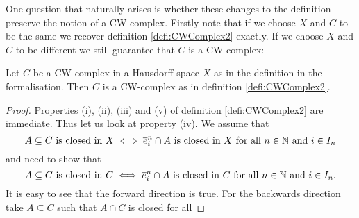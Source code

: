One question that naturally arises is whether these changes to the definition preserve the notion of a CW-complex. 
Firstly note that if we choose $X$ and $C$ to be the same we recover definition \ref{defi:CWComplex2} exactly. 
If we choose $X$ and $C$ to be different we still guarantee that $C$ is a CW-complex: 

\begin{lem}
  Let $C$ be a CW-complex in a Hausdorff space $X$ as in the definition in the formalisation. 
  Then $C$ is a CW-complex as in definition \ref{defi:CWComplex2}. 
\end{lem}
\begin{proof}
  Properties (i), (ii), (iii) and (v) of definition \ref{defi:CWComplex2} are immediate. 
  Thus let us look at property (iv). 
  We assume that 
  \[A \subseteq C \text{ is closed in } X \iff \closedCell{n}{i} \cap A \text{ is closed in } X \text{ for all } n \in \bN \text{ and } i \in I_n\]
  and need to show that 
  \[A \subseteq C \text{ is closed in } C \iff \closedCell{n}{i} \cap A \text{ is closed in } C \text{ for all } n \in \bN \text{ and } i \in I_n.\]
  It is easy to see that the forward direction is true. 
  For the backwards direction take $A \subseteq C$ such that $A \cap C$ is closed for all 
\end{proof}